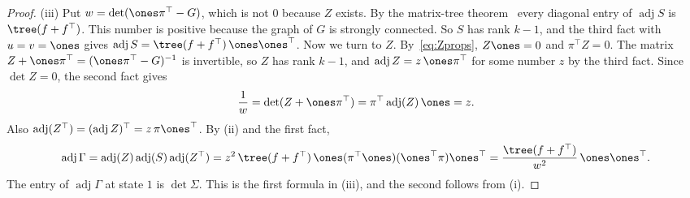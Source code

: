 \begin{proof}
(iii) Put $w=\det(\ones\pi^\top-G)$, which is not $0$ because $Z$ exists. By the matrix-tree
theorem~\cite{bollobas1998} every diagonal entry of $\operatorname{adj}S$ is
$\tree(f+f^\top)$. This number is positive because the graph of $G$ is strongly connected. So
$S$ has rank $k-1$, and the third fact with $u=v=\ones$ gives
$\operatorname{adj}S=\tree(f+f^\top)\,\ones\ones^\top$. Now we turn to $Z$.
By~\eqref{eq:Zprops}, $Z\ones=0$ and $\pi^\top Z=0$. The matrix
$Z+\ones\pi^\top=(\ones\pi^\top-G)^{-1}$ is invertible, so $Z$ has rank $k-1$, and
$\operatorname{adj}Z=z\,\ones\pi^\top$ for some number $z$ by the third fact. Since $\det Z=0$,
the second fact gives
\[
\frac1w=\det(Z+\ones\pi^\top)=\pi^\top\operatorname{adj}(Z)\,\ones=z .
\]
Also $\operatorname{adj}(Z^\top)=(\operatorname{adj}Z)^\top=z\,\pi\ones^\top$. By (ii) and the
first fact,
\[
\operatorname{adj}\Gamma=\operatorname{adj}(Z)\operatorname{adj}(S)\operatorname{adj}(Z^\top)
=z^2\,\tree(f+f^\top)\,\ones(\pi^\top\ones)(\ones^\top\pi)\ones^\top
=\frac{\tree(f+f^\top)}{w^2}\,\ones\ones^\top .
\]
The entry of $\operatorname{adj}\Gamma$ at state $1$ is $\det\Sigma$. This is the first formula
in (iii), and the second follows from (i).
\end{proof}
